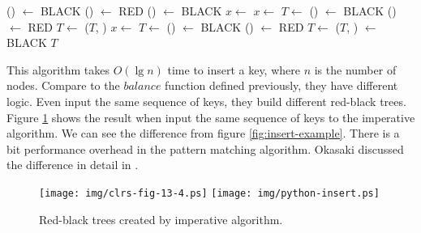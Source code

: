 \documentclass[b5paper]{article}
\begin{document}
\begin{algorithmic}[1]
      \State {}() $\gets$ BLACK
      \State {}() $\gets$ RED
      \State {}() $\gets$ BLACK
      \State $x \gets$ 
    \Else
          \State $x \gets$ 
          \State $T \gets$ 
        \EndIf
        \State {}() $\gets$ BLACK
        \State {}() $\gets$ RED
        \State $T \gets$ ($T$, )
      \Else
          \State $x \gets$ 
          \State $T \gets$ 
        \EndIf
        \State {}() $\gets$ BLACK
        \State {}() $\gets$ RED
        \State $T \gets$ ($T$, )
      \EndIf
    \EndIf
  \EndWhile
  \State {} $\gets$ BLACK
  \State \Return $T$
\EndFunction
\end{algorithmic}

This algorithm takes $O(\lg n)$ time to insert a key, where $n$ is the number of nodes. Compare to the $balance$ function defined previously, they have different logic. Even input the same sequence of keys, they build different red-black trees. Figure \ref{fig:imperative-insert} shows the result when input the same sequence of keys to the imperative algorithm. We can see the difference from figure \ref{fig:insert-example}. There is a bit performance overhead in the pattern matching algorithm. Okasaki discussed the difference in detail in \cite{okasaki}.

\begin{figure}[htbp]
   \centering
   \texttt{[image: img/clrs-fig-13-4.ps]}
   \texttt{[image: img/python-insert.ps]}
   \caption{Red-black trees created by imperative algorithm.}
   \label{fig:imperative-insert}
\end{figure}
\end{document}
